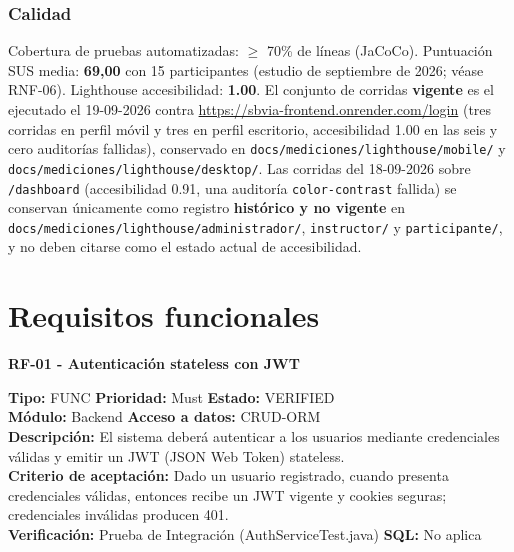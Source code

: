 \documentclass[11pt,a4paper]{article}
\begin{document}
\subsubsection*{Calidad}
Cobertura de pruebas automatizadas: $\geq$ 70\% de líneas (JaCoCo). Puntuación SUS media: \textbf{69,00} con 15 participantes (estudio de septiembre de 2026; véase RNF-06). Lighthouse accesibilidad: \textbf{1.00}. El conjunto de corridas \textbf{vigente} es el ejecutado el 19-09-2026 contra \url{https://sbvia-frontend.onrender.com/login} (tres corridas en perfil móvil y tres en perfil escritorio, accesibilidad 1.00 en las seis y cero auditorías fallidas), conservado en \texttt{docs/mediciones/lighthouse/mobile/} y \texttt{docs/mediciones/lighthouse/desktop/}. Las corridas del 18-09-2026 sobre \texttt{/dashboard} (accesibilidad 0.91, una auditoría \texttt{color-contrast} fallida) se conservan únicamente como registro \textbf{histórico y no vigente} en \texttt{docs/mediciones/lighthouse/administrador/}, \texttt{instructor/} y \texttt{participante/}, y no deben citarse como el estado actual de accesibilidad.

\newpage
\section{Requisitos funcionales}

\newenvironment{requisito}[1]{
    \vspace{0.5cm}
    \noindent\tabularx{\textwidth}{@{}|X|@{}}
    \hline
     \textbf{#1} \\
    \hline
}{
    \\ \hline
    \endtabularx
}

\begin{requisito}{RF-01 - Autenticación stateless con JWT}
    \textbf{Tipo:} FUNC \quad \textbf{Prioridad:} Must \quad \textbf{Estado:} VERIFIED \\[0.2cm]
    \textbf{Módulo:} Backend \quad \textbf{Acceso a datos:} CRUD-ORM \\[0.2cm]
    \textbf{Descripción:} El sistema deberá autenticar a los usuarios mediante credenciales válidas y emitir un JWT (JSON Web Token) stateless. \\[0.2cm]
    \textbf{Criterio de aceptación:} Dado un usuario registrado, cuando presenta credenciales válidas, entonces recibe un JWT vigente y cookies seguras; credenciales inválidas producen 401. \\[0.2cm]
    \textbf{Verificación:} Prueba de Integración (AuthServiceTest.java) \quad \textbf{SQL:} No aplica
\end{requisito}
\end{document}
